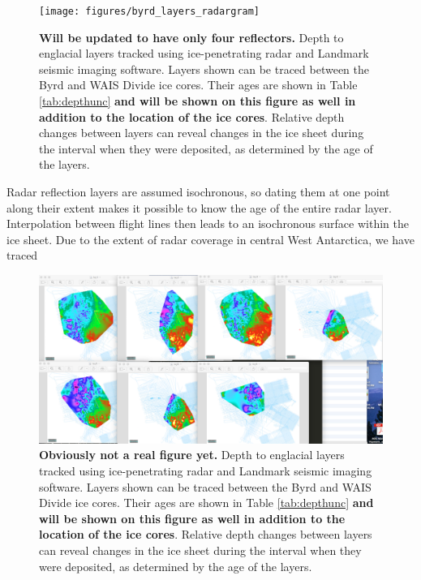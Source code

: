 \begin{figure}[h]
\centering
\texttt{[image: figures/byrd\_layers\_radargram]}
\caption[]{\textbf{Will be updated to have only four reflectors.} Depth to englacial layers tracked using ice-penetrating radar and Landmark seismic imaging software. Layers shown can be traced between the Byrd and WAIS Divide ice cores. Their ages are shown in Table \ref{tab:depthunc} \textbf{and will be shown on this figure as well in addition to the location of the ice cores}. Relative depth changes between layers can reveal changes in the ice sheet during the interval when they were deposited, as determined by the age of the layers. }
\label{fig:layergram}
\end{figure}


Radar reflection layers are assumed isochronous, so dating them at one point along their extent makes it possible to know the age of the entire radar layer. Interpolation between flight lines then leads to an isochronous surface within the ice sheet. Due to the extent of radar coverage in central West Antarctica, we have traced 




\begin{figure}[h]
\centering
\includegraphics[scale=0.2]{figures/poor-mans-layer-surface-compare}
\caption[]{\textbf{Obviously not a real figure yet.} Depth to englacial layers tracked using ice-penetrating radar and Landmark seismic imaging software. Layers shown can be traced between the Byrd and WAIS Divide ice cores. Their ages are shown in Table \ref{tab:depthunc} \textbf{and will be shown on this figure as well in addition to the location of the ice cores}. Relative depth changes between layers can reveal changes in the ice sheet during the interval when they were deposited, as determined by the age of the layers. }
\label{fig:layer_surf}
\end{figure}